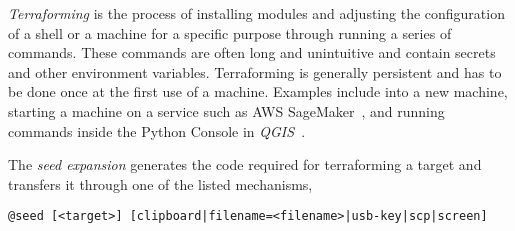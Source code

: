 \emph{Terraforming} is the process of installing modules and adjusting the configuration of a shell or a machine for a specific purpose through running a series of commands. These commands are often long and unintuitive and contain secrets and other environment variables. Terraforming is generally persistent and has to be done once at the first use of a machine. Examples include  into a new machine, starting a machine on a service such as AWS SageMaker~\cite{sagemaker}, and running commands inside the Python Console in \emph{QGIS}~\cite{QGIS_python_console}. 

The \emph{seed expansion} generates the code required for terraforming a target and transfers it through one of the listed mechanisms,
%
\begin{verbatim}
@seed [<target>] [clipboard|filename=<filename>|usb-key|scp|screen]
\end{verbatim}